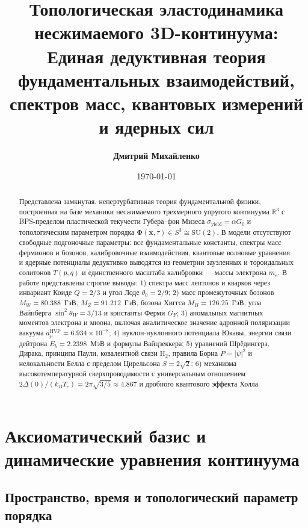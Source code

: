\documentclass[11pt,a4paper,oneside]{article}
\title{\textbf{Топологическая эластодинамика несжимаемого 3D-континуума:}\\
	\Large Единая дедуктивная теория фундаментальных взаимодействий, спектров масс, квантовых измерений и ядерных сил}
\author{\textbf{Дмитрий Михайленко}}
\date{\today}
\theoremstyle{plain}
\theoremstyle{definition}
\theoremstyle{remark}
\numberwithin{equation}{section}
\begin{document}
	
	\maketitle
	
	\begin{abstract}
		Представлена замкнутая, непертурбативная теория фундаментальной физики, построенная на базе механики несжимаемого трехмерного упругого континуума $\mathbb{R}^3$ с BPS-пределом пластической текучести Губера--фон Мизеса $\sigma_{\text{yield}} = \alpha G_0$ и топологическим параметром порядка $\boldsymbol{\Phi}(\mathbf{x}, \tau) \in S^3 \cong \mathrm{SU}(2)$. В модели отсутствуют свободные подгоночные параметры: все фундаментальные константы, спектры масс фермионов и бозонов, калибровочные взаимодействия, квантовые волновые уравнения и ядерные потенциалы дедуктивно выводятся из геометрии заузленных и тороидальных солитонов $T(p,q)$ и единственного масштаба калибровки — массы электрона $m_e$. В работе представлены строгие выводы: 1) спектра масс лептонов и кварков через инвариант Коиде $Q = 2/3$ и угол Лоде $\theta_0 = 2/9$; 2) масс промежуточных бозонов $M_W = 80.388$~ГэВ, $M_Z = 91.212$~ГэВ, бозона Хиггса $M_H = 126.25$~ГэВ, угла Вайнберга $\sin^2\theta_W = 3/13$ и константы Ферми $G_F$; 3) аномальных магнитных моментов электрона и мюона, включая аналитическое значение адронной поляризации вакуума $a_\mu^{\text{HVP}} = 6.934 \times 10^{-8}$; 4) нуклон-нуклонного потенциала Юкавы, энергии связи дейтрона $E_b = 2.2398$~МэВ и формулы Вайцзеккера; 5) уравнений Шрёдингера, Дирака, принципа Паули, ковалентной связи $\text{H}_2$, правила Борна $P = |\psi|^2$ и нелокальности Белла с пределом Цирельсона $S = 2\sqrt{2}$; 6) механизма высокотемпературной сверхпроводимости с универсальным отношением $2\Delta(0)/(k_B T_c) = 2\pi\sqrt{3/5} \approx 4.867$ и дробного квантового эффекта Холла.
	\end{abstract}
	
	\tableofcontents

	\newpage
	
	\section{Аксиоматический базис и динамические уравнения континуума}
	
	\subsection{Пространство, время и топологический параметр порядка}
	
\end{document}
